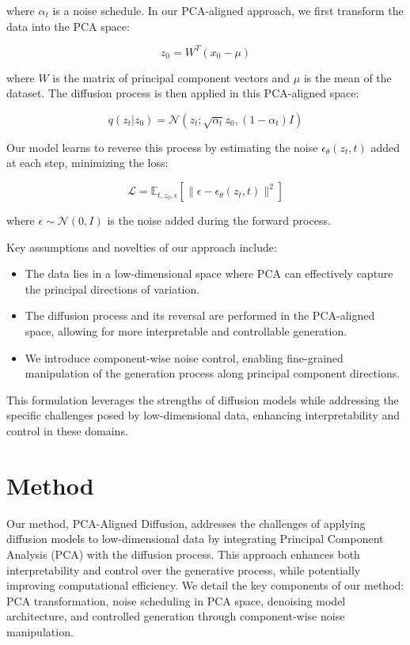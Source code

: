 \documentclass{article} %
\begin{document}
where $\alpha_t$ is a noise schedule. In our PCA-aligned approach, we first transform the data into the PCA space:

\begin{equation}
    z_0 = W^T(x_0 - \mu)
\end{equation}

where $W$ is the matrix of principal component vectors and $\mu$ is the mean of the dataset. The diffusion process is then applied in this PCA-aligned space:

\begin{equation}
    q(z_t|z_0) = \mathcal{N}(z_t; \sqrt{\alpha_t}z_0, (1-\alpha_t)I)
\end{equation}

Our model learns to reverse this process by estimating the noise $\epsilon_\theta(z_t, t)$ added at each step, minimizing the loss:

\begin{equation}
    \mathcal{L} = \mathbb{E}_{t,z_0,\epsilon}\left[\|\epsilon - \epsilon_\theta(z_t, t)\|^2\right]
\end{equation}

where $\epsilon \sim \mathcal{N}(0, I)$ is the noise added during the forward process.

Key assumptions and novelties of our approach include:
\begin{itemize}
    \item The data lies in a low-dimensional space where PCA can effectively capture the principal directions of variation.
    \item The diffusion process and its reversal are performed in the PCA-aligned space, allowing for more interpretable and controllable generation.
    \item We introduce component-wise noise control, enabling fine-grained manipulation of the generation process along principal component directions.
\end{itemize}

This formulation leverages the strengths of diffusion models while addressing the specific challenges posed by low-dimensional data, enhancing interpretability and control in these domains.

\section{Method}
\label{sec:method}

Our method, PCA-Aligned Diffusion, addresses the challenges of applying diffusion models to low-dimensional data by integrating Principal Component Analysis (PCA) with the diffusion process. This approach enhances both interpretability and control over the generative process, while potentially improving computational efficiency. We detail the key components of our method: PCA transformation, noise scheduling in PCA space, denoising model architecture, and controlled generation through component-wise noise manipulation.
\end{document}

